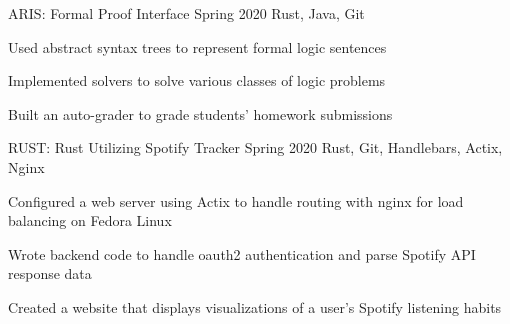 \begin{cventries}
  \cvcourse
    {ARIS: Formal Proof Interface}
    {Spring 2020}
    {Rust, Java, Git}
    {
      \begin{cvitems}
        \item {Used abstract syntax trees to represent formal logic sentences}
        \item {Implemented solvers to solve various classes of logic problems}
        \item {Built an auto-grader to grade students' homework submissions}
      \end{cvitems}
    }
    
  \cvcourse
    {RUST: Rust Utilizing Spotify Tracker}
    {Spring 2020}
    {Rust, Git, Handlebars, Actix, Nginx}
    {
      \begin{cvitems}
        \item {Configured a web server using Actix to handle routing with nginx for load balancing on Fedora Linux}
        \item {Wrote backend code to handle oauth2 authentication and parse Spotify API response data}
        \item {Created a website that displays visualizations of a user's Spotify listening habits}
      \end{cvitems}
    }
\end{cventries}
